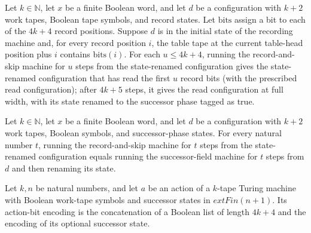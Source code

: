 \begin{lemma}
\label{Turing.StepBlock.recordSkipTM_fixed}
\leanok
{}
Let $k\in\mathbb{N}$, let $x$ be a finite Boolean word, and let $d$ be a configuration
with $k+2$ work tapes, Boolean tape symbols, and record states. Let $\mathrm{bits}$
assign a bit to each of the $4k+4$ record positions. Suppose $d$ is in the initial state
of the recording machine and, for every record position $i$, the table tape at the
current table-head position plus $i$ contains $\mathrm{bits}(i)$. For each $u\le 4k+4$,
running the record-and-skip machine for $u$ steps from the state-renamed configuration
gives the state-renamed configuration that has read the first $u$ record bits (with the
prescribed read configuration); after $4k+5$ steps, it gives the read configuration at
full width, with its state renamed to the successor phase tagged as true.
\end{lemma}

\begin{lemma}
\label{Turing.StepBlock.recordSkipTM_tail}
\leanok
{}
Let $k\in\mathbb{N}$, let $x$ be a finite Boolean word, and let $d$ be a configuration
with $k+2$ work tapes, Boolean symbols, and successor-phase states. For every natural
number $t$, running the record-and-skip machine for $t$ steps from the state-renamed
configuration equals running the successor-field machine for $t$ steps from $d$ and then
renaming its state.
\end{lemma}

\begin{lemma}
\label{Turing.StepBlock.actionBitsK_split}
\leanok
{}
Let $k,n$ be natural numbers, and let $a$ be an action of a $k$-tape Turing machine with
Boolean work-tape symbols and successor states in $	ext{Fin}(n+1)$. Its action-bit
encoding is the concatenation of a Boolean list of length $4k+4$ and the encoding of its
optional successor state.
\end{lemma}

